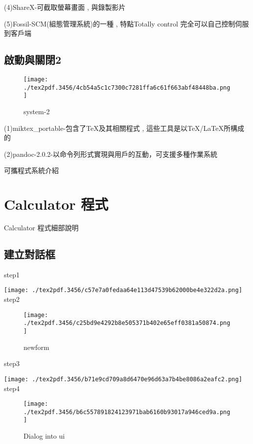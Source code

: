 \documentclass[12pt,,]{report}
\begin{document}
(4)ShareX-可截取螢幕畫面 , 與錄製影片

(5)Fossil-SCM(組態管理系統)的一種 , 特點Totally control
完全可以自己控制伺服到客戶端

\hypertarget{ux555fux52d5ux8207ux95dcux95892}{%
\section{啟動與關閉2}\label{ux555fux52d5ux8207ux95dcux95892}}

\begin{figure}
\centering
\texttt{[image: ./tex2pdf.3456/4cb54a5c1c7300c7281ffa6c61f663abf48448ba.png]}
\caption{system-2\label{fig:格子}}
\end{figure}

(1)miktex\_portable-包含了TeX及其相關程式 ,
這些工具是以TeX/LaTeX所構成的

(2)pandoc-2.0.2-以命令列形式實現與用戶的互動，可支援多種作業系統

可攜程式系統介紹

\hypertarget{calculator-ux7a0bux5f0f}{%
\chapter{Calculator 程式}\label{calculator-ux7a0bux5f0f}}

Calculator 程式細部說明

\hypertarget{ux5efaux7acbux5c0dux8a71ux6846}{%
\section{建立對話框}\label{ux5efaux7acbux5c0dux8a71ux6846}}

step1

\texttt{[image: ./tex2pdf.3456/c57e7a0fedaa64e113d47539b62000be4e322d2a.png]}
step2

\begin{figure}
\centering
\texttt{[image: ./tex2pdf.3456/c25bd9e4292b8e505371b402e65eff0381a50874.png]}
\caption{newform\label{fig:新建}}
\end{figure}

step3

\texttt{[image: ./tex2pdf.3456/b71e9cd709a8d6470e96d63a7b4be8086a2eafc2.png]}
step4

\begin{figure}
\centering
\texttt{[image: ./tex2pdf.3456/b6c557891824123971bab6160b93017a946ced9a.png]}
\caption{Dialog into ui\label{fig:放入}}
\end{figure}
\end{document}
